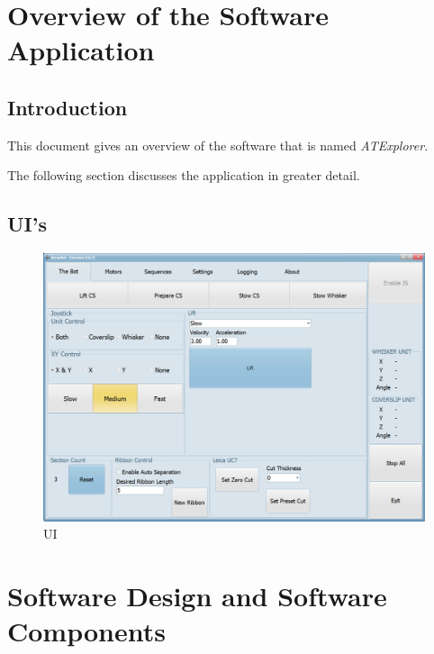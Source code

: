\documentclass[11pt,fleqn]{book} %
\begin{document}


\chapter{Overview of the \ate{} Software Application}
\section{Introduction}

\doublespacing
This document gives an overview of the software that is named \emph{ATExplorer}.

The following section discusses the application in greater detail.

\clearpage

\section{\ate UI's}

\begin{figure}
\centering\includegraphics[scale=0.85]{AB_UI_1}
\caption{\ate{} UI}
\end{figure}

\clearpage


\chapter{Software Design and Software Components}
\end{document}
